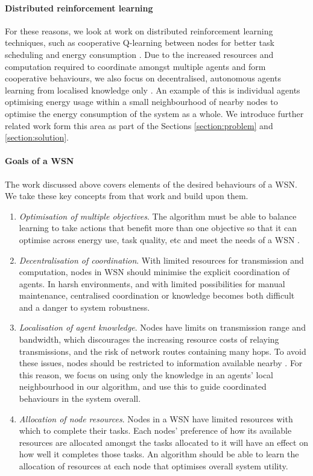 \paragraph{Distributed reinforcement learning}
For these reasons, we look at work on distributed reinforcement learning techniques, such as cooperative Q-learning between nodes for better task scheduling and energy consumption \citep{doi:10.1155/2014/765182}. Due to the increased resources and computation required to coordinate amongst multiple agents and form cooperative behaviours, we also focus on decentralised, autonomous agents learning from localised knowledge only \citep{10.1007/978-3-642-11814-2_4}.  An example of this is individual agents optimising energy usage within a small neighbourhood of nearby nodes to optimise the energy consumption of the system as a whole. We introduce further related work form this area as part of the Sections \ref{section:problem} and \ref{section:solution}.


\paragraph{Goals of a WSN}
The work discussed above covers elements of the desired behaviours of a WSN. We take these key concepts from that work and build upon them.

\begin{enumerate}
	\item \textit{Optimisation of multiple objectives}.  The algorithm must be able to balance learning to take actions that benefit more than one objective so that it can optimise across energy use, task quality, etc and meet the needs of a WSN \citep{Guo2019, s150717572, SENGUPTA2013405}.

	\item \textit{Decentralisation of coordination}. With limited resources for transmission and computation, nodes in WSN should minimise the explicit coordination of agents.  In harsh environments, and with limited possibilities for manual maintenance, centralised coordination or knowledge becomes both difficult and a danger to system robustness.
	
	\item \textit{Localisation of agent knowledge}. Nodes have limits on transmission range and bandwidth, which discourages the increasing resource costs of relaying transmissions, and the risk of network routes containing many hops. To avoid these issues, nodes should be restricted to information available nearby \citep{10.1007/978-3-642-11814-2_4}. For this reason, we focus on using only the knowledge in an agents' local neighbourhood in our algorithm, and use this to guide coordinated behaviours in the system overall.
	
	\item \textit{Allocation of node resources}. Nodes in a WSN have limited resources with which to complete their tasks. Each nodes' preference of how its available resources are allocated amongst the tasks allocated to it will have an effect on how well it completes those tasks. An algorithm should be able to learn the allocation of resources at each node that optimises overall system utility. 
\end{enumerate}

